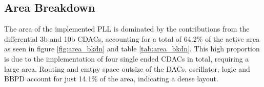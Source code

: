 \subsection{Area Breakdown}
The area of the implemented PLL is dominated by the contributions from the differential 3b and 10b CDACs, accounting for a total of 64.2\% of the active area as seen in figure \ref{fig:area_bkdn} and table \ref{tab:area_bkdn}. This high proportion is due to the implementation of four single ended CDACs in total, requiring a large area. Routing and emtpy space outsize of the DACs, oscillator, logic and BBPD account for just 14.1\% of the area, indicating a dense layout. 
\vspace{-1em}
\begin{figure}[htb!]
	\begin{floatrow}
	\end{floatrow}
\end{figure}	

